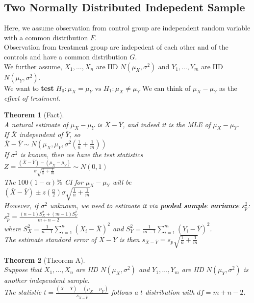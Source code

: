\documentclass[12pt]{article}
\newtheorem{theorem}{Theorem}[section]
\theoremstyle{definition}
\begin{document}
\subsection{Two Normally Distributed Indepedent Sample}
Here, we assume observation from control group are independent random variable with a common distribution $F$.\\
Observation from treatment group are indepedent of each other and of the controls and have a common distribution $G$.\\
We further assume, $X_1,\ldots, X_n$ are IID $N(\mu_X, \sigma^2)$ and $Y_1,\ldots, Y_m$ are IID $N(\mu_Y, \sigma^2)$.\\
We want to \textbf{test}
$
H_0:\mu_X=\mu_Y\text{ vs }H_1:\mu_X\neq \mu_Y
$
We can think of $\mu_X-\mu_Y$ as the \textit{effect of treatment}.\\
\begin{theorem}[Fact]
\hfill\\\normalfont A \textit{natural estimate} of $\mu_X-\mu_Y$ is $\bar{X}-\bar{Y}$, and indeed it is the MLE of $\mu_X-\mu_Y$.\\
If $\bar{X}$ independent of $\bar{Y}$, so\\
$
\bar{X}-\bar{Y}\sim N(\mu_X,\mu_Y, \sigma^2(\frac{1}{n}+\frac{1}{m}))
$\\
If $\sigma^2$ is known, then we have the test statistics\\
$
Z=\frac{(\bar{X}-\bar{Y})-(\mu_X-\mu_Y)}{\sigma\sqrt{\frac{1}{n}+\frac{1}{m}}}\sim N(0,1)
$\\
The $100(1-\alpha)\%$ CI for $\mu_X-\mu_Y$ will be\\
$
(\bar{X}-\bar{Y})\pm z(\frac{\alpha}{2})\sigma\sqrt{\frac{1}{n}+\frac{1}{m}}
$\\
However, if $\sigma^2$ unknown, we need to estimate it via \textbf{pooled sample variance} $s_p^2$:\\
$
s_p^2=\frac{(n-1)S_X^2+(m-1)S_Y^2}{m+n-2}
$\\
where $S_X^2=\frac{1}{n-1}\sum_{i=1}^n(X_i-\bar{X})^2$ and $S_Y^2=\frac{1}{m-1}\sum_{i=1}^m(Y_i-\bar{Y})^2$.\\
The estimate standard error of $\bar{X}-\bar{Y}$ is then
$
s_{\bar{X}-\bar{Y}}=s_p\sqrt{\frac{1}{n}+\frac{1}{m}}
$
\end{theorem}
\begin{theorem}[Theorem A]
\hfill\\\normalfont Suppose that $X_1,\ldots, X_n$ are IID $N(\mu_X,\sigma^2)$ and $Y_1,\ldots, Y_m$ are IID $N(\mu_Y,\sigma^2)$ is another independent sample.\\
The statistic
$
t=\frac{(\bar{X}-\bar{Y})-(\mu_X-\mu_Y)}{s_{\bar{X}-\bar{Y}}}
$
follows a $t$ distribution with $df=m+n-2$.
\end{theorem}
\end{document}
